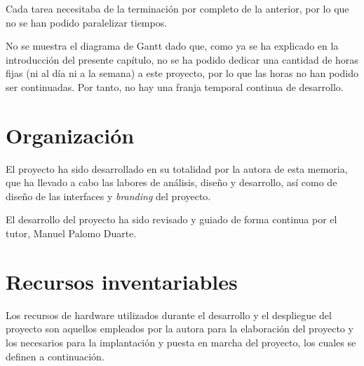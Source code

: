 Cada tarea necesitaba de la terminación por completo de la anterior, por lo que
no se han podido paralelizar tiempos.

No se muestra el diagrama de Gantt dado que, como ya se ha explicado en la
introducción del presente capítulo, no se ha podido dedicar una cantidad de horas
fijas (ni al día ni a la semana) a este proyecto, por lo que las horas no han
podido ser continuadas. Por tanto, no hay una franja temporal continua de
desarrollo.

\section{Organización}

El proyecto ha sido desarrollado en su totalidad por la autora de esta memoria,
que ha llevado a cabo las labores de análisis, diseño y desarrollo, así como de
diseño de las interfaces y \textit{branding} del proyecto.

El desarrollo del proyecto ha sido revisado y guiado de forma continua por el
tutor, Manuel Palomo Duarte.

\section{Recursos inventariables}

Los recursos de hardware utilizados durante el desarrollo y el despliegue del
proyecto son aquellos empleados por la autora para la elaboración del
proyecto y los necesarios para la implantación y puesta en marcha del proyecto,
los cuales se definen a continuación.


